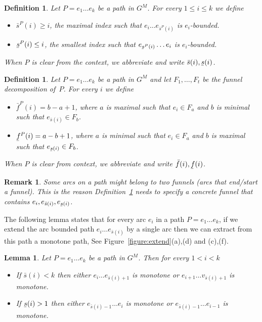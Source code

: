 \documentclass[11pt]{article}
\newtheorem{lemma}[theorem]{Lemma}
\newtheorem{definition}[theorem]{Definition}
\newtheorem{remark}{Remark}
\newcommand{\ubar}[1]{\underaccent{\bar}{{#1}}}
\begin{document}
\begin{definition}
    Let $P=e_1 \ldots e_k$ be a path in $G^M$. For every $1\le i \le k$ we define
    \begin{itemize}
        \item $\bar{s}^P(i)\ge i$, the maximal index such that $e_i \ldots e_{\bar{s}^P(i)}$ is $e_i$-bounded.
        \item $\ubar{s}^P(i)\le i$, the smallest index such that $ e_{\ubar{s}^P(i)} \ldots e_i$ is $e_i$-bounded.
    \end{itemize}
    When $P$ is clear from the context, we abbreviate and write $\bar{s}(i),\ubar{s}(i)$.
\end{definition}

\begin{definition}\label{def:funnel-distance}
    Let $P= e_1 \ldots e_k$ be a path in $G^M$ and let $F_1,\ldots, F_t$ be the funnel decomposition of~$P$. For every $i$ we define
    \begin{itemize}
        \item $\bar{f}^P(i)=b-a+1$, where $a$ is maximal such that $e_i \in F_{a}$ and $b$ is minimal such that $e_{\bar{s}(i)}\in F_{b}$.
        \item $\ubar{f}^P(i)=a-b+1$, where  $a$ is minimal such that $e_i \in F_{a}$ and $b$ is maximal such that $e_{\ubar{s}(i)}\in F_{b}$.
    \end{itemize}
    When $P$ is clear from context, we abbreviate and write $\bar{f}(i),\ubar{f}(i)$.
\end{definition}

\begin{remark}
    Some arcs on a path might belong to two funnels (arcs that end/start a funnel). This is the reason Definition~\ref{def:funnel-distance} needs to specify a concrete funnel that contains $e_i,e_{\bar{s}(i)},e_{\ubar{s}(i)}$.
\end{remark}

The following lemma states that for every arc $e_i$ in a path $P=e_1 \ldots e_k$, if we extend the arc bounded path $e_i \ldots e_{\bar{s}(i)}$ by a single arc then we can extract from this path a monotone path, See Figure~\ref{figure:extend}(a),(d) and (c),(f).

\begin{lemma}\label{lemma:-bounded-to-monotone}
    Let $P = e_1 \ldots e_k$ be a path in $G^M$. Then for every  $1 < i < k$
    \begin{itemize}
        \item If $\bar{s}(i) < k$ then either $e_i \ldots e_{\bar{s}(i)+1}$ is monotone or $e_{i+1} \ldots v_{\bar{s}(i)+1}$ is monotone.
        \item If $\ubar{s}(i) > 1$ then either $e_{\bar{s}(i)-1}\ldots e_i$ is monotone or $e_{\bar{s}(i)-1}\ldots e_{i-1}$ is monotone.
    \end{itemize}
\end{lemma}
\end{document}
